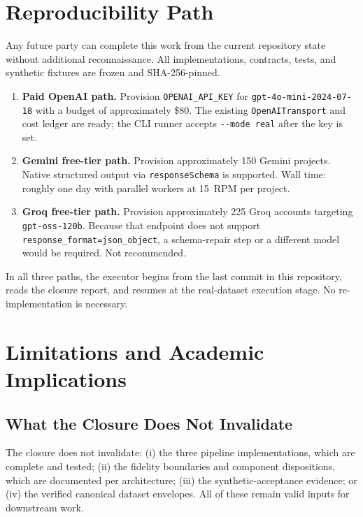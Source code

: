 \documentclass[11pt,a4paper]{article}
\begin{document}
\section{Reproducibility Path}
\label{sec:repro}

Any future party can complete this work from the current repository state without additional reconnaissance. All implementations, contracts, tests, and synthetic fixtures are frozen and SHA-256-pinned.

\begin{enumerate}[leftmargin=*]
  \item \textbf{Paid OpenAI path.} Provision \texttt{OPENAI\_API\_KEY} for \texttt{gpt-4o-mini-2024-07-18} with a budget of approximately \$80. The existing \texttt{OpenAITransport} and cost ledger are ready; the CLI runner accepts \texttt{-{}-mode real} after the key is set.
  \item \textbf{Gemini free-tier path.} Provision approximately 150 Gemini projects. Native structured output via \texttt{responseSchema} is supported. Wall time: roughly one day with parallel workers at 15~RPM per project.
  \item \textbf{Groq free-tier path.} Provision approximately 225 Groq accounts targeting \texttt{gpt-oss-120b}. Because that endpoint does not support \texttt{response\_format=json\_object}, a schema-repair step or a different model would be required. Not recommended.
\end{enumerate}

In all three paths, the executor begins from the last commit in this repository, reads the closure report, and resumes at the real-dataset execution stage. No re-implementation is necessary.

\section{Limitations and Academic Implications}
\label{sec:limit}

\subsection{What the Closure Does Not Invalidate}

The closure does not invalidate: (i) the three pipeline implementations, which are complete and tested; (ii) the fidelity boundaries and component dispositions, which are documented per architecture; (iii) the synthetic-acceptance evidence; or (iv) the verified canonical dataset envelopes. All of these remain valid inputs for downstream work.
\end{document}
